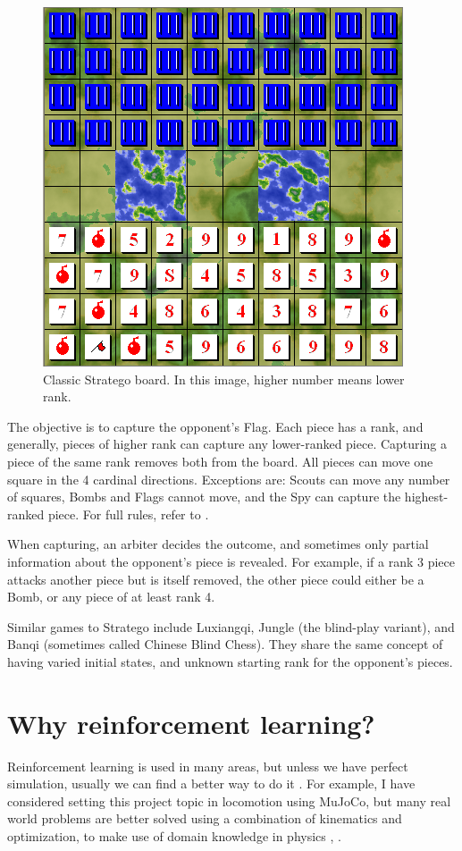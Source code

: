 \documentclass{article}
\begin{document}
\begin{figure}[H]
	\centering
	\includegraphics[width=.75\linewidth]{Stratego}
	\caption{Classic Stratego board. In this image, higher number means lower rank.}
\end{figure}

The objective is to capture the opponent's Flag. Each piece has a rank, and generally, pieces of higher rank can capture any lower-ranked piece. Capturing a piece of the same rank removes both from the board. All pieces can move one square in the 4 cardinal directions. Exceptions are: Scouts can move any number of squares, Bombs and Flags cannot move, and the Spy can capture the highest-ranked piece. For full rules, refer to \cite{ISFrules}.

When capturing, an arbiter decides the outcome, and sometimes only partial information about the opponent's piece is revealed. For example, if a rank 3 piece attacks another piece but is itself removed, the other piece could either be a Bomb, or any piece of at least rank 4.

Similar games to Stratego include Luxiangqi, Jungle (the blind-play variant), and Banqi (sometimes called Chinese Blind Chess). They share the same concept of having varied initial states, and unknown starting rank for the opponent's pieces.

\section{Why reinforcement learning?}
Reinforcement learning is used in many areas, but unless we have perfect simulation, usually we can find a better way to do it \cite{rlblogpost}. For example, I have considered setting this project topic in locomotion using MuJoCo, but many real world problems are better solved using a combination of kinematics and optimization, to make use of domain knowledge in physics \cite{tassa2012}, \cite{kuindersma2016}.
\end{document}
